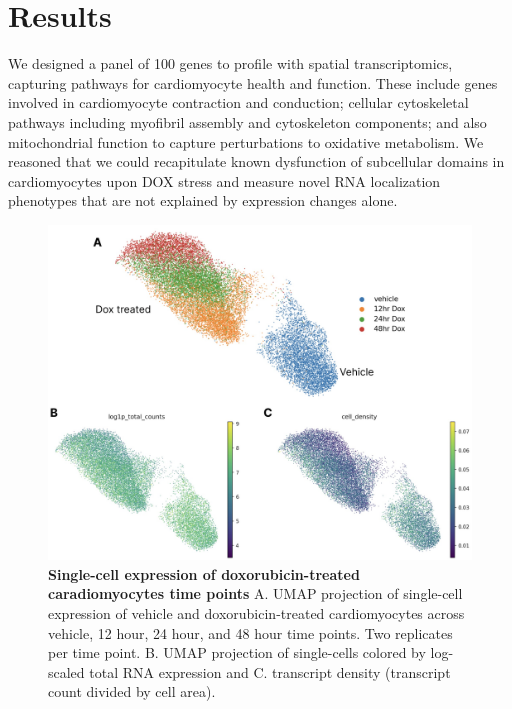 \section{Results}

We designed a panel of 100 genes to profile with spatial transcriptomics, capturing pathways for cardiomyocyte health and function\cite{mahBentoToolkitSubcellular2022}. These include genes involved in cardiomyocyte contraction and conduction; cellular cytoskeletal pathways including myofibril assembly and cytoskeleton components; and also mitochondrial function to capture perturbations to oxidative metabolism. We reasoned that we could recapitulate known dysfunction of subcellular domains in cardiomyocytes upon DOX stress and measure novel RNA localization phenotypes that are not explained by expression changes alone.

\begin{figure}[p]
    \centering
    \includegraphics[width=\textwidth]{2_figures-and-files/Fig1.jpg}
    \caption[Single-cell expression of doxorubicin-treated caradiomyocytes time points]{\textbf{Single-cell expression of doxorubicin-treated caradiomyocytes time points} A. UMAP projection of single-cell expression of vehicle and doxorubicin-treated cardiomyocytes across vehicle, 12 hour, 24 hour, and 48 hour time points. Two replicates per time point. B. UMAP projection of single-cells colored by log-scaled total RNA expression and C. transcript density (transcript count divided by cell area).}
    \label{fig:Doxorubicin treatment single-cell expression}
\end{figure}

